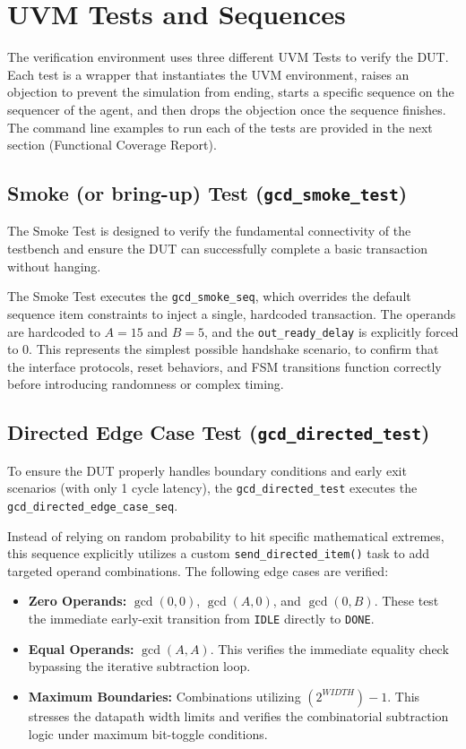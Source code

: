 \newpage
\section{UVM Tests and Sequences}

The verification environment uses three different UVM Tests to verify the DUT. Each test is a wrapper that instantiates the UVM environment, raises an objection to prevent the simulation from ending, starts a specific sequence on the sequencer of the agent, and then drops the objection once the sequence finishes.
The command line examples to run each of the tests are provided in the next section (Functional Coverage Report).

\subsection{Smoke (or bring-up) Test (\texttt{gcd\_smoke\_test})}
The Smoke Test is designed to verify the fundamental connectivity of the testbench and ensure the DUT can successfully complete a basic transaction without hanging. 

The Smoke Test executes the \texttt{gcd\_smoke\_seq}, which overrides the default sequence item constraints to inject a single, hardcoded transaction. The operands are hardcoded to $A = 15$ and $B = 5$, and the \texttt{out\_ready\_delay} is explicitly forced to 0. This represents the simplest possible handshake scenario, to confirm that the interface protocols, reset behaviors, and FSM transitions function correctly before introducing randomness or complex timing.

\subsection{Directed Edge Case Test (\texttt{gcd\_directed\_test})}
To ensure the DUT properly handles boundary conditions and early exit scenarios (with only 1 cycle latency), the \texttt{gcd\_directed\_test} executes the \texttt{gcd\_directed\_edge\_case\_seq}. 

Instead of relying on random probability to hit specific mathematical extremes, this sequence explicitly utilizes a custom \texttt{send\_directed\_item()} task to add targeted operand combinations. The following edge cases are verified:
\begin{itemize}
    \item \textbf{Zero Operands:} $\gcd(0,0)$, $\gcd(A,0)$, and $\gcd(0,B)$. These test the immediate early-exit transition from \texttt{IDLE} directly to \texttt{DONE}.
    \item \textbf{Equal Operands:} $\gcd(A,A)$. This verifies the immediate equality check bypassing the iterative subtraction loop.
    \item \textbf{Maximum Boundaries:} Combinations utilizing $(2^{WIDTH}) - 1$. This stresses the datapath width limits and verifies the combinatorial subtraction logic under maximum bit-toggle conditions.
\end{itemize}

